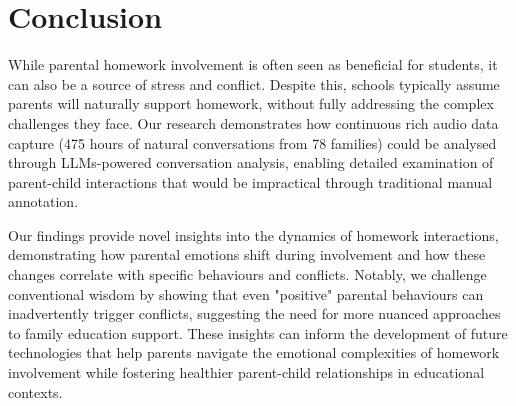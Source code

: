 \section{Conclusion}



While parental homework involvement is often seen as beneficial for students, it can also be a source of stress and conflict. Despite this, schools typically assume parents will naturally support homework, without fully addressing the complex challenges they face. Our research demonstrates how continuous rich audio data capture (475 hours of natural conversations from 78 families) could be analysed through LLMs-powered conversation analysis, enabling detailed examination of parent-child interactions that would be impractical through traditional manual annotation.

Our findings provide novel insights into the dynamics of homework interactions, demonstrating how parental emotions shift during involvement and how these changes correlate with specific behaviours and conflicts. Notably, we challenge conventional wisdom by showing that even "positive" parental behaviours can inadvertently trigger conflicts, suggesting the need for more nuanced approaches to family education support. These insights can inform the development of future technologies that help parents navigate the emotional complexities of homework involvement while fostering healthier parent-child relationships in educational contexts.

